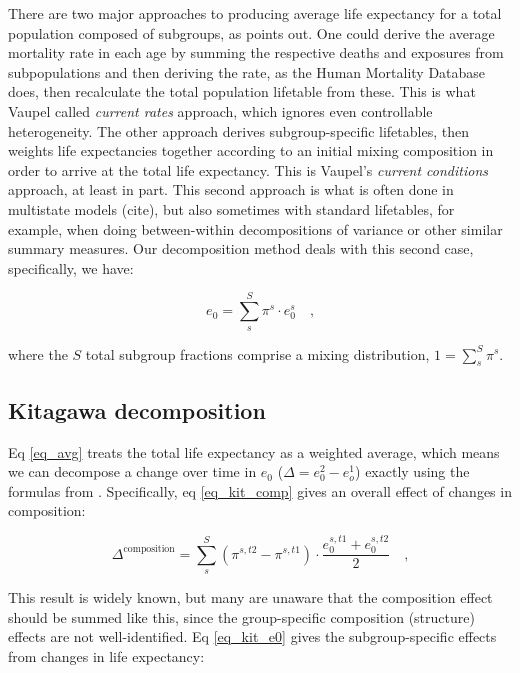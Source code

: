 \documentclass[sn-apa,pdflatex]{sn-jnl}
\theoremstyle{remark}
\theoremstyle{definition}
\begin{document}
There are two major approaches to producing average life expectancy for
a total population composed of subgroups, as \citet{vaupel2002life}
points out. One could derive the average mortality rate in each age by
summing the respective deaths and exposures from subpopulations and then
deriving the rate, as the Human Mortality Database
\citet{wilmoth2021methods} does, then recalculate the total population
lifetable from these. This is what Vaupel called \emph{current rates}
approach, which ignores even controllable heterogeneity. The other
approach derives subgroup-specific lifetables, then weights life
expectancies together according to an initial mixing composition in
order to arrive at the total life expectancy. This is Vaupel's
\emph{current conditions} approach, at least in part. This second
approach is what is often done in multistate models (cite), but also
sometimes with standard lifetables, for example, when doing
between-within decompositions of variance or other similar summary
measures. Our decomposition method deals with this second case,
specifically, we have:

\begin{equation}
\label{eq_avg}
e_0 = \sum_s^S \pi^s \cdot e_0^s \quad \textrm{,}
\end{equation}

\noindent where the \(S\) total subgroup fractions comprise a mixing
distribution, \(1 = \sum_s^S \pi^s\).

\hypertarget{kitagawa-decomposition}{%
\subsection{Kitagawa decomposition}\label{kitagawa-decomposition}}

Eq \eqref{eq_avg} treats the total life expectancy as a weighted
average, which means we can decompose a change over time in \(e_0\)
(\(\Delta = e_0^2 - e_o^1\)) exactly using the formulas from
\citet{kitagawa1955components}. Specifically, eq \eqref{eq_kit_comp}
gives an overall effect of changes in composition:

\begin{equation}
\label{eq_kit_comp}
\Delta^\text{composition} = \sum_s^S \left(\pi^{s,t2}- \pi^{s,t1}\right) \cdot \frac{e_0^{s,t1} + e_0^{s,t2}}{2} \quad \textrm{,}
\end{equation}

This result is widely known, but many are unaware that the composition
effect should be summed like this, since the group-specific composition
(structure) effects are not well-identified. Eq \eqref{eq_kit_e0} gives
the subgroup-specific effects from changes in life expectancy:
\end{document}
